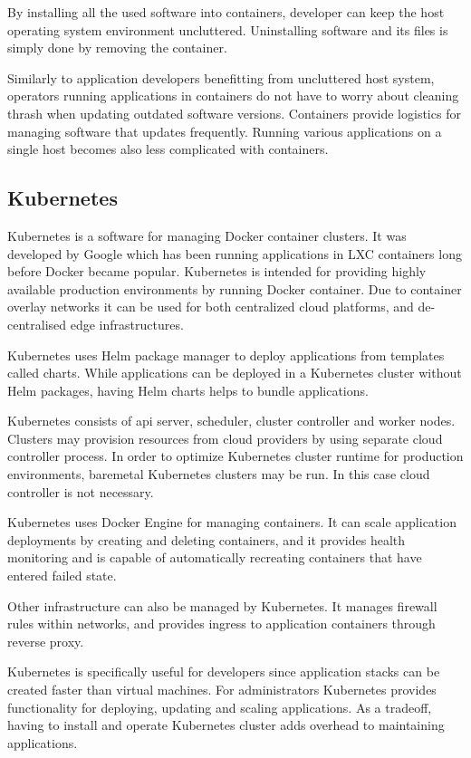 \documentclass[officiallayout]{tktla}
\begin{document}
By installing all the used software into containers, developer can keep the
host operating system environment uncluttered. Uninstalling software and its
files is simply done by removing the container.

Similarly to application developers benefitting from uncluttered host system,
operators running applications in containers do not have to worry about
cleaning thrash when updating outdated software versions. Containers provide
logistics for managing software that updates frequently. Running various
applications on a single host becomes also less complicated with containers.

\subsection{Kubernetes}

Kubernetes \cite{kubernetes} is a software for managing Docker container
clusters. It was developed by Google which has been running applications in LXC
containers long before Docker became popular. Kubernetes is intended for
providing highly available production environments by running Docker container.
Due to container overlay networks it can be used for both centralized cloud
platforms, and de-centralised edge infrastructures.

Kubernetes uses Helm package manager to deploy applications from templates
called charts. While applications can be deployed in a Kubernetes cluster
without Helm packages, having Helm charts helps to bundle applications.

Kubernetes consists of api server, scheduler, cluster controller and worker
nodes. Clusters may provision resources from cloud providers by using separate
cloud controller process. In order to optimize Kubernetes cluster runtime for
production environments, baremetal Kubernetes clusters may be run. In this case
cloud controller is not necessary.

Kubernetes uses Docker Engine for managing containers. It can scale application
deployments by creating and deleting containers, and it provides health
monitoring and is capable of automatically recreating containers that have
entered failed state.

Other infrastructure can also be managed by Kubernetes. It manages firewall
rules within networks, and provides ingress to application containers through
reverse proxy.

Kubernetes is specifically useful for developers since application stacks can
be created faster than virtual machines. For administrators Kubernetes provides
functionality for deploying, updating and scaling applications. As a tradeoff,
having to install and operate Kubernetes cluster adds overhead to maintaining
applications.
\end{document}
